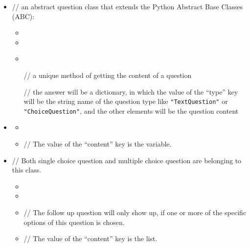 \documentclass[a4paper]{scrreprt}
\begin{document}
\begin{itemize}
                    \item {}
                        \par // an abstract question class that extends the Python Abstract Base Classes (ABC): 
                        \begin{itemize}
                            \item {}
                            \item {}
                            \item {} \\
                                \par // a unique method of getting the content of a question
                                \par // the answer will be a dictionary, in which the value of the “type” key will be the string name of the question type like \verb|"TextQuestion"| or \verb|"ChoiceQuestion"|, and the other elements will be the question content
                        \end{itemize}

                    \item {}
                        \begin{itemize}
                            \item {}
                            \item {}
                                \par // The value of the “content” key is the  variable.
                        \end{itemize}

                    \item {}
                        \par // Both single choice question and multiple choice question are belonging to this class.
                        \begin{itemize}
                            \item {}
                            \item {}
                            \item {}
                                \par // The follow up question will only show up, if one or more of the specific options of this question is chosen.
                            \item {}
                                \par // The value of the “content” key is the  list.
                        \end{itemize}


\end{itemize}
\end{document}
